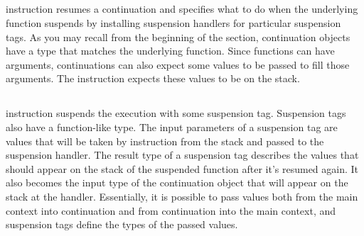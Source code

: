 \subsection*{\wasmresume}
\wasmresume instruction resumes a continuation and specifies what to do when the underlying function suspends by installing
suspension handlers for particular suspension tags. As you may recall from the beginning of the section,
continuation objects have a type that matches the underlying function. Since functions can have arguments,
continuations can also expect some values to be passed to fill those arguments. The \wasmresume
instruction expects these values to be on the stack.

\subsection*{\wasmsuspend}
\wasmsuspend instruction suspends the execution with some suspension tag. Suspension tags also have a function-like
type. The input parameters of a suspension tag are values that will be taken by \wasmsuspend instruction from the stack
and passed to the suspension handler. The result type of a suspension tag describes the values that should appear on
the stack of the suspended function after it's resumed again. It also becomes the input type of the continuation
object that will appear on the stack at the handler. Essentially, it is possible to pass values both
from the main context into continuation and from continuation into the main context, and suspension tags
define the types of the passed values.

